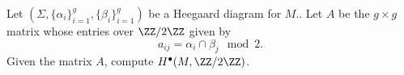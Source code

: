 

    Let $(\Sigma, \{\alpha_i\}_{i=1}^g, \{\beta_i\}_{i=1}^g)$ be a Heegaard diagram for $M$.. Let $A$ be the $g\times g$ matrix whose entries over $\ZZ/2\ZZ$ given by  
    \[a_{ij}=\alpha_{i}\cap \beta_j \mod 2.\] 
    Given the matrix $A$, compute $H^\bullet(M, \ZZ/2\ZZ)$.

